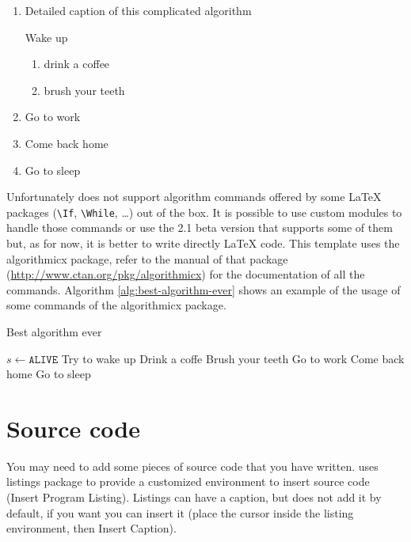 \begin{algorithm}[h]
\begin{enumerate}
\item \caption[Short caption of the algorithm]{\label{alg:the-algorithm}Detailed caption of this complicated algorithm}
Wake up

\begin{enumerate}
\item drink a coffee
\item brush your teeth
\end{enumerate}
\item Go to work
\item Come back home
\item Go to sleep
\end{enumerate}
\end{algorithm}
Unfortunately \LyX{} does not support algorithm commands offered by
some \LaTeX{} packages (\texttt{\textbackslash If}, \texttt{\textbackslash While},
\ldots ) out of the box. It is possible to use custom modules to handle
those commands or use the 2.1 beta version that supports some of them
but, as for now, it is better to write directly \LaTeX{} code. This
template uses the \textsf{algorithmicx} package, refer to the manual
of that package (\url{http://www.ctan.org/pkg/algorithmicx}) for
the documentation of all the commands. Algorithm \ref{alg:best-algorithm-ever}
shows an example of the usage of some commands of the \textsf{algorithmicx}
package.

\begin{algorithm}[h]
\caption{\label{alg:best-algorithm-ever}Best algorithm ever}
\begin{algorithmic}[1]
	\State $s \gets \texttt{ALIVE}$ 
		\Repeat {}
			\State Try to wake up
		\State Drink a coffe 
		\State Brush your teeth
		\State Go to work 
		\State Come back home
		\State Go to sleep
	\EndWhile
\end{algorithmic}
\end{algorithm}

\section{Source code}

You may need to add some pieces of source code that you have written.
\LyX{} uses \textsf{listings} package to provide a customized environment
to insert source code (\textsf{Insert} \textsf{\lyxarrow{} Program
Listing}). Listings can have a caption, but \LyX{} does not add it
by default, if you want you can insert it (place the cursor inside
the listing environment, then \textsf{Insert \lyxarrow{} Caption}).

